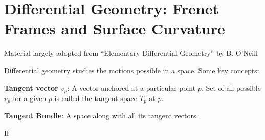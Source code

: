 \chapter{Differential Geometry: Frenet Frames and Surface Curvature}

\begin{remark}
  Material largely adopted from ``Elementary Differential Geometry''
  by B. O'Neill
\end{remark}

Differential geometry studies the motions possible in a space. Some
key concepts:

\textbf{Tangent vector $v_p$}: A vector anchored at a particular
point $p$. Set of all possible $v_p$ for a given $p$ is called the tangent
space $T_p$ at $p$.


\textbf{Tangent Bundle}: A space along with all its tangent vectors.

\begin{example}
  If 
\end{example}
